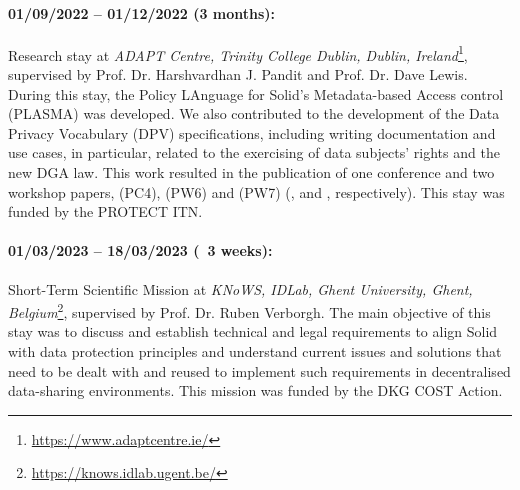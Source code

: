 \paragraph{01/09/2022 -- 01/12/2022 (3 months):} Research stay at \textit{ADAPT Centre, Trinity College Dublin, Dublin, Ireland}\footnote{\url{https://www.adaptcentre.ie/}}, supervised by Prof. Dr. Harshvardhan J. Pandit and Prof. Dr. Dave Lewis. During this stay, the Policy LAnguage for Solid’s Metadata-based Access control (PLASMA) was developed. We also contributed to the development of the Data Privacy Vocabulary (DPV) specifications, including writing documentation and use cases, in particular, related to the exercising of data subjects' rights and the new DGA law. This work resulted in the publication of one conference and two workshop papers, (PC4), (PW6) and (PW7) (\cite{esteves_semantics_2023}, \cite{esteves_towards_2023} and \cite{esteves_using_2023}, respectively). This stay was funded by the PROTECT ITN.

\paragraph{01/03/2023 -- 18/03/2023 (~3 weeks):} Short-Term Scientific Mission at \textit{KNoWS, IDLab, Ghent University, Ghent, Belgium}\footnote{\url{https://knows.idlab.ugent.be/}}, supervised by Prof. Dr. Ruben Verborgh. The main objective of this stay was to discuss and establish technical and legal requirements to align Solid with data protection principles and understand current issues and solutions that need to be dealt with and reused to implement such requirements in decentralised data-sharing environments. This mission was funded by the DKG COST Action.
